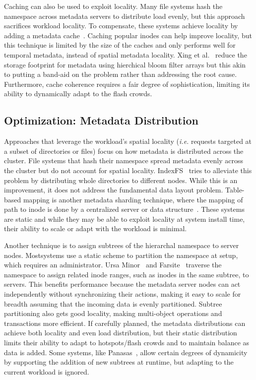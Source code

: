Caching can also be used to exploit locality.  Many file systems hash the
namespace across metadata servers to distribute load evenly, but this approach
sacrifices workload locality. To compensate, these systems achieve locality by
adding a metadata cache~\cite{li:msst2006-dynamic, xing:sc2009-skyfs,
zhu:pds2008-hba}.  Caching popular inodes can help improve locality, but this
technique is limited by the size of the caches and only performs well for
temporal metadata, instead of spatial metadata locality. Xing et
al.~\cite{xing:sc2009-skyfs} reduce the storage footprint for metadata using
hierchical bloom filter arrays but this akin to putting a band-aid on the
problem rather than addressing the root cause.  Furthermore, cache coherence
requires a fair degree of sophistication, limiting its ability to dynamically
adapt to the flash crowds.

\subsection{Optimization: Metadata Distribution}

Approaches that leverage the workload's spatial locality ({\it i.e.} requests
targeted at a subset of directories or files) focus on how metadata is
distributed across the cluster. File systems that hash their namespace spread
metadata evenly across the cluster but do not account for spatial locality.
IndexFS~\cite{patil:fast2011-giga+} tries to alleviate this problem by
distributing whole directories to different nodes.  While this is an
improvement, it does not address the fundamental data layout problem.
Table-based mapping is another metadata sharding technique, where the mapping
of path to inode is done by a centralized server or data
structure~\cite{xing:sc2009-skyfs, hildebrand:msst2005-pnfs,
thomson:fast2015-calvinfs}. These systems are static and while they may be able
to exploit locality at system install time, their ability to scale or adapt
with the workload is minimal.

Another technique is to assign subtrees of the hierarchal namespace to server
nodes. Mostsystems use a static scheme to partition the namespace at setup,
which requires an administrator. Ursa Minor~\cite{sinnamohideen:atc2010-ursa}
and Farsite~\cite{doucer:osdi2006-farsite-dir} traverse the namespace to assign
related inode ranges, such as inodes in the same subtree, to servers. This
benefits performance because the metadata server nodes can act independently
without synchronizing their actions, making it easy to scale for breadth
assuming that the incoming data is evenly partitioned.  Subtree partitioning
also gets good locality, making multi-object operations and transactions more
efficient. If carefully planned, the metadata distributions can achieve both
locality and even load distribution, but their static distribution limits their
ability to adapt to hotspots/flash crowds and to maintain balance as data is
added.  Some systems, like Panasas~\cite{welch:fast2008-panasas}, allow certain
degrees of dynamicity by supporting the addition of new subtrees at runtime,
but adapting to the current workload is ignored. 

